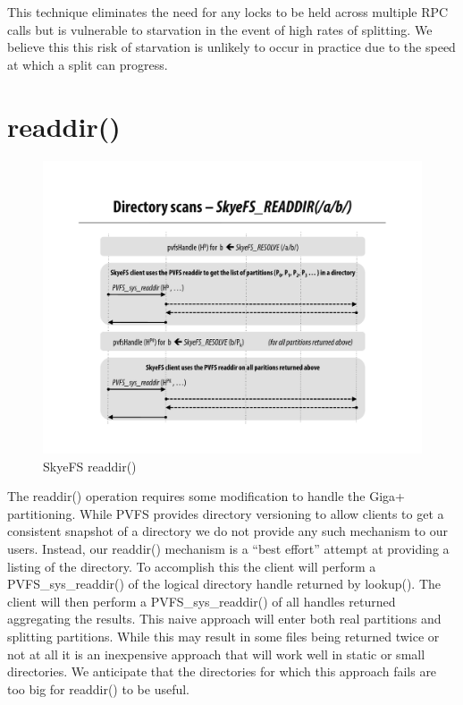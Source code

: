 \documentclass[letterpaper]{article}
\begin{document}
This technique eliminates the need for any locks to be held across multiple RPC
calls but is vulnerable to starvation in the event of high rates of splitting.
We believe this this risk of starvation is unlikely to occur in practice due to
the speed at which a split can progress.

\section{readdir()}
\begin{figure}
\begin{center}
\includegraphics[scale=0.4]{figure-readdir}
\end{center}
\caption{SkyeFS readdir()}
\end{figure}
The readdir() operation requires some modification to handle the Giga+
partitioning.  While PVFS provides directory versioning to allow clients to
get a consistent snapshot of a directory we do not provide any such mechanism
to our users.  Instead, our readdir() mechanism is a ``best effort'' attempt
at providing a listing of the directory.  To accomplish this the client will
perform a PVFS\_sys\_readdir() of the logical directory handle returned by
lookup().  The client will then perform a PVFS\_sys\_readdir() of all handles
returned aggregating the results.  This naive approach will enter both real
partitions and splitting partitions.  While this may result in some files
being returned twice or not at all it is an inexpensive approach that will
work well in static or small directories.  We anticipate that the directories
for which this approach fails are too big for readdir() to be useful.
\end{document}
